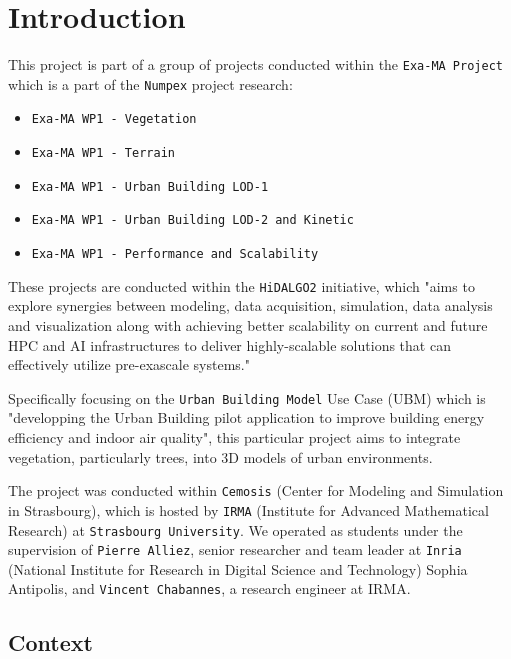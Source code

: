 \documentclass[12pt]{article}
\begin{document}
\tableofcontents

\newpage

\section{Introduction}

This project is part of a group of projects conducted within the \texttt{Exa-MA Project}
\cite{exaMA} which is a part of the \texttt{Numpex} project research\cite{numpex}:
\begin{itemize}
    \item \texttt{Exa-MA WP1 - Vegetation}
    \item \texttt{Exa-MA WP1 - Terrain}
    \item \texttt{Exa-MA WP1 - Urban Building LOD-1}
    \item \texttt{Exa-MA WP1 - Urban Building LOD-2 and Kinetic}
    \item \texttt{Exa-MA WP1 - Performance and Scalability}
\end{itemize}

These projects are conducted within the \texttt{HiDALGO2}\cite{hidalgo2} initiative, which
"aims to explore synergies between modeling, data acquisition, simulation,
data analysis and visualization along with achieving better scalability on
current and future HPC and AI infrastructures to deliver highly-scalable
solutions that can effectively utilize pre-exascale systems."\cite{hidalgo2-about}

Specifically focusing on the \texttt{Urban Building Model}\cite{hidalgo2-ubm}
Use Case (UBM) which is "developping the Urban Building pilot application to
improve building energy efficiency and indoor air quality"\cite{hidalgo2-ubm},
this particular project aims to integrate vegetation, particularly trees, into 3D models
of urban environments.

The project was conducted within \texttt{Cemosis}\cite{cemosis} (Center for
Modeling and Simulation in Strasbourg), which is hosted by
\texttt{IRMA}\cite{irma} (Institute for Advanced Mathematical Research) at
\texttt{Strasbourg University}. We operated as students under the supervision of
\texttt{Pierre Alliez}\cite{alliez}, senior researcher and team leader at
\texttt{Inria}\cite{Inria} (National Institute for Research in Digital Science
and Technology) Sophia Antipolis, and \texttt{Vincent Chabannes}\cite{chabannes},
a research engineer at IRMA.

\subsection{Context}
\end{document}
